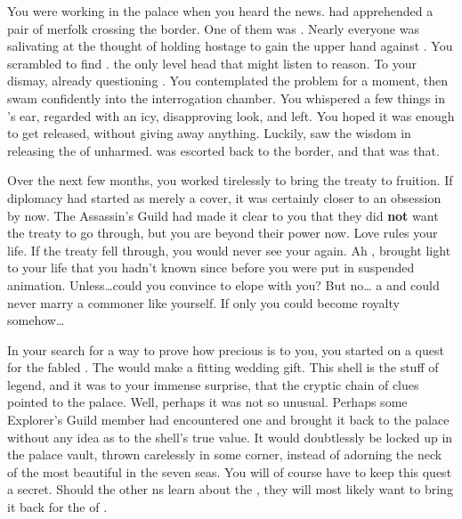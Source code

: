 \documentclass[char]{NeptuneBall}
\begin{document}
You were working in the palace when you heard the news. \cPrince{\Prince} \cPrince{} had apprehended a pair of merfolk crossing the border. One of them was \cPrincess{\Prince} \cPrincess{}. Nearly everyone was salivating at the thought of holding \cPrincess{\them} hostage to gain the upper hand against \pAtlantis{}. You scrambled to find \cPrince{}. \cPrince{\They} \cPrince{\were} the only level head that might listen to reason. To your dismay, \cPrince{\they} \cPrince{\were} already questioning \cPrincess{}. You contemplated the problem for a moment, then swam confidently into the interrogation chamber. You whispered a few things in \cPrince{}'s ear, regarded \cPrincess{} with an icy, disapproving look, and left. You hoped it was enough to get \cPrincess{\them} released, without giving away anything. Luckily, \cPrince{} saw the wisdom in releasing the \cPrincess{\prince} of \pAtlantis{} unharmed. \cPrincess{} was escorted back to the border, and that was that.

Over the next few months, you worked tirelessly to bring the treaty to fruition. If diplomacy had started as merely a cover, it was certainly closer to an obsession by now. The Assassin's Guild had made it clear to you that they did {\bf not} want the treaty to go through, but you are beyond their power now. Love rules your life. If the treaty fell through, you would never see your \cPrincess{} again. Ah \cPrincess{}, \cPrincess{\they} brought light to your life that you hadn't known since before you were put in suspended animation. Unless\ldots could you convince \cPrincess{} to elope with you? But no\ldots \cPrincess{\they} \cPrincess{\are} a \cPrincess{\prince} and could never marry a commoner like yourself. If only you could become royalty somehow\ldots

In your search for a way to prove how precious \cPrincess{} is to you, you started on a quest for the fabled \iGlowShell{\MYname}. The \iGlowShell{\MYname} would make a fitting wedding gift. This shell is the stuff of legend, and it was to your immense surprise, that the cryptic chain of clues pointed to the \pAtlantis{} palace. Well, perhaps it was not so unusual. Perhaps some Explorer's Guild member had encountered one and brought it back to the palace without any idea as to the shell's true value. It would doubtlessly be locked up in the palace vault, thrown carelessly in some corner, instead of adorning the neck of the most beautiful \cPrincess{\mer} in the seven seas. You will of course have to keep this quest a secret. Should the other \pPacifica{}ns learn about the \iGlowShell{}, they will most likely want to bring it back for the \cPacificanRuler{\King} of \pPacifica{}.
\end{document}

